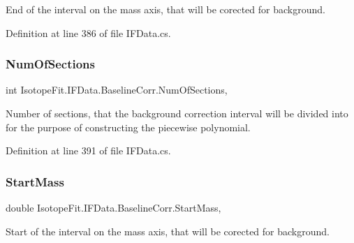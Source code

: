 End of the interval on the mass axis, that will be corected for background. 



Definition at line 386 of file I\+F\+Data.\+cs.

\mbox{\label{class_isotope_fit_1_1_i_f_data_1_1_baseline_corr_a61f4eeb14295a1d2ba1b80dd36163505}} 
\subsubsection{\texorpdfstring{Num\+Of\+Sections}{NumOfSections}}
{\footnotesize\ttfamily int Isotope\+Fit.\+I\+F\+Data.\+Baseline\+Corr.\+Num\+Of\+Sections\hspace{0.3cm}{\ttfamily [get]}, {\ttfamily [set]}}



Number of sections, that the background correction interval will be divided into for the purpose of constructing the piecewise polynomial. 



Definition at line 391 of file I\+F\+Data.\+cs.

\mbox{\label{class_isotope_fit_1_1_i_f_data_1_1_baseline_corr_a9c464d39ab74e62c887b450002256902}} 
\subsubsection{\texorpdfstring{Start\+Mass}{StartMass}}
{\footnotesize\ttfamily double Isotope\+Fit.\+I\+F\+Data.\+Baseline\+Corr.\+Start\+Mass\hspace{0.3cm}{\ttfamily [get]}, {\ttfamily [set]}}



Start of the interval on the mass axis, that will be corected for background. 



